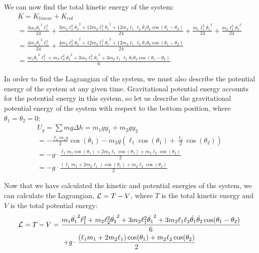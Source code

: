 \documentclass[]{article}
\begin{document}
We can now find the total kinetic energy of the system:
\begin{gather*}
	K = K_{linear} + K_{rot} \\
	= \frac{3m_1\dot{\theta_1}^2\ell_1^2}{24} + \frac{3m_2\ell_2^2\dot{\theta_2}^2 +12m_2\ell_1^2\dot{\theta_1}^2 + 12m_2\ell_1\ell_2\dot{\theta_1}\dot{\theta_2}\cos(\theta_1 - \theta_2)}{24} + \frac{m_1\ell_1^2\dot{\theta_1}^2}{24} + \frac{m_2\ell_2^2\dot{\theta_2}^2}{24} \\
	= \frac{4m_1\dot{\theta_1}^2\ell_1^2}{24} + \frac{4m_2\ell_2^2\dot{\theta_2}^2 +12m_2\ell_1^2\dot{\theta_1}^2 + 12m_2\ell_1\ell_2\dot{\theta_1}\dot{\theta_2}\cos(\theta_1 - \theta_2)}{24} \\
	= \frac{m_1\dot{\theta_1}^2\ell_1^2 + m_2\ell_2^2\dot{\theta_2}^2 + 3m_2\ell_1^2\dot{\theta_1}^2 + 3m_2\ell_1\ell_2\dot{\theta_1}\dot{\theta_2}\cos(\theta_1 - \theta_2)}{6}
\end{gather*}

In order to find the Lagrangian of the system, we must also describe the potential energy of the system at any given time. Gravitational potential energy accounts for the potential energy in this system, so let us describe the gravitational potential energy of the system with respect to the bottom position, where $\theta_1 = \theta_2 = 0$:
\begin{gather*}
	U_g = \sum mg\Delta h = m_1gy_1 + m_2gy_2 \\
	= -\frac{\ell_1m_1g}{2}\cos(\theta_1) - m_2g(\ell_1\cos(\theta_1) + \frac{\ell_2}{2}\cos(\theta_2)) \\
	= -g\cdot\frac{\ell_1m_1\cos(\theta_1) + 2m_2\ell_1\cos(\theta_1) + m_2\ell_2\cos(\theta_2)}{2} \\
	= -g\cdot\frac{(\ell_1m_1 + 2m_2\ell_1)\cos(\theta_1) + m_2\ell_2\cos(\theta_2)}{2}
\end{gather*}

Now that we have calculated the kinetic and potential energies of the system, we can calculate the Lagrangian, $\mathcal{L} = T - V$, where $T$ is the total kinetic energy and $V$ is the total potential energy:
\begin{gather*}
	\mathcal{L} = T - V = \frac{m_1\dot{\theta_1}^2\ell_1^2 + m_2\ell_2^2\dot{\theta_2}^2 + 3m_2\ell_1^2\dot{\theta_1}^2 + 3m_2\ell_1\ell_2\dot{\theta_1}\dot{\theta_2}\cos(\theta_1 - \theta_2)}{6} \\ + g\cdot\frac{(\ell_1m_1 + 2m_2\ell_1)\cos(\theta_1) + m_2\ell_2\cos(\theta_2)}{2}
\end{gather*}
\end{document}
